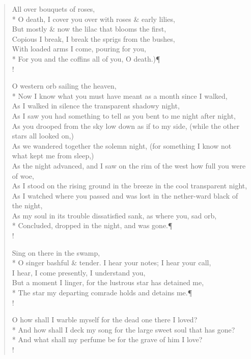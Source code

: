 \documentclass[MAIN]{subfiles}
\begin{document}
\begin{verse}
All over bouquets of roses,\\*
O death, I cover you over with roses \& early lilies,\\
But mostly \& now the lilac that blooms the first,\\ 
Copious I break, I break the sprigs from the bushes,\\
With loaded arms I come, pouring for you,\\*
For you and the coffins all of you, O death.)\P\\! 

O western orb sailing the heaven,\\*
Now I know what you must have meant as a month since I walked,\\
As I walked in silence the transparent shadowy night,\\ 
As I saw you had something to tell as you bent to me night after night,\\
As you drooped from the sky low down as if to my side, (while the other stars all looked on,)\\
As we wandered together the solemn night, (for something I know not what kept me from sleep,)\\ 
As the night advanced, and I saw on the rim of the west how full you were of woe,\\
As I stood on the rising ground in the breeze in the cool transparent night,\\
As I watched where you passed and was lost in the nether-ward black of the night,\\ 
As my soul in its trouble dissatisfied sank, as where you, sad orb,\\*
Concluded, dropped in the night, and was gone.\P\\!

Sing on there in the swamp,\\*
O singer bashful \& tender. I hear your notes; I hear your call,\\
I hear, I come presently, I understand you,\\
But a moment I linger, for the lustrous star has detained me,\\*
The star my departing comrade holds and detains me.\P\\!

O how shall I warble myself for the dead one there I loved?\\*
And how shall I deck my song for the large sweet soul that has gone?\\*
And what shall my perfume be for the grave of him I love?\\!


\end{verse}
\end{document}
